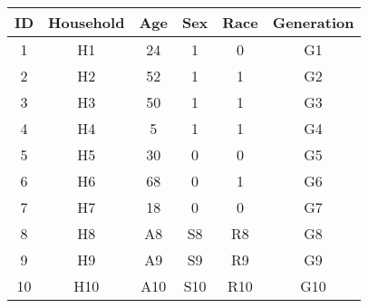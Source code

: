 \begin{tabular}{cccccc}
ID & Household & Age & Sex & Race & Generation \\
\hline
\hline
1 & H1 & 24 & 1 & 0 & G1  \\
\hline
2 & H2 & 52 & 1 & 1 & G2  \\
\hline
3 & H3 & 50 & 1 & 1 & G3  \\
\hline
4 & H4 & 5 & 1 & 1 & G4  \\
\hline
5 & H5 & 30 & 0 & 0 & G5  \\
\hline
6 & H6 & 68 & 0 & 1 & G6  \\
\hline
7 & H7 & 18 & 0 & 0 & G7  \\
\hline
8 & H8 & A8 & S8 & R8 & G8  \\
\hline
9 & H9 & A9 & S9 & R9 & G9  \\
\hline
10 & H10 & A10 & S10 & R10 & G10  \\
\hline
\end{tabular}
